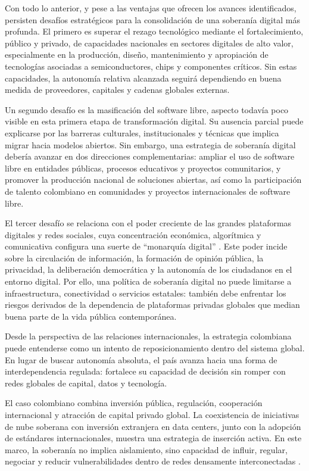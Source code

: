 \documentclass[9pt,letterpaper,twocolumn,twoside,apabib]{rho-class/rho}
\begin{document}
Con todo lo anterior, y pese a las ventajas que ofrecen los avances identificados, persisten desafíos estratégicos para la consolidación de una soberanía digital más profunda. El primero es superar el rezago tecnológico mediante el fortalecimiento, público y privado, de capacidades nacionales en sectores digitales de alto valor, especialmente en la producción, diseño, mantenimiento y apropiación de tecnologías asociadas a semiconductores, chips y componentes críticos. Sin estas capacidades, la autonomía relativa alcanzada seguirá dependiendo en buena medida de proveedores, capitales y cadenas globales externas.

Un segundo desafío es la masificación del software libre, aspecto todavía poco visible en esta primera etapa de transformación digital. Su ausencia parcial puede explicarse por las barreras culturales, institucionales y técnicas que implica migrar hacia modelos abiertos. Sin embargo, una estrategia de soberanía digital debería avanzar en dos direcciones complementarias: ampliar el uso de software libre en entidades públicas, procesos educativos y proyectos comunitarios, y promover la producción nacional de soluciones abiertas, así como la participación de talento colombiano en comunidades y proyectos internacionales de software libre.

El tercer desafío se relaciona con el poder creciente de las grandes plataformas digitales y redes sociales, cuya concentración económica, algorítmica y comunicativa configura una suerte de “monarquía digital” \parencite{peirano_enemigo_nodate}. Este poder incide sobre la circulación de información, la formación de opinión pública, la privacidad, la deliberación democrática y la autonomía de los ciudadanos en el entorno digital. Por ello, una política de soberanía digital no puede limitarse a infraestructura, conectividad o servicios estatales: también debe enfrentar los riesgos derivados de la dependencia de plataformas privadas globales que median buena parte de la vida pública contemporánea.


Desde la perspectiva de las relaciones internacionales, la estrategia colombiana puede entenderse como un intento de reposicionamiento dentro del sistema global. En lugar de buscar autonomía absoluta, el país avanza hacia una forma de interdependencia regulada: fortalece su capacidad de decisión sin romper con redes globales de capital, datos y tecnología.

El caso colombiano combina inversión pública, regulación, cooperación internacional y atracción de capital privado global. La coexistencia de iniciativas de nube soberana con inversión extranjera en data centers, junto con la adopción de estándares internacionales, muestra una estrategia de inserción activa. En este marco, la soberanía no implica aislamiento, sino capacidad de influir, regular, negociar y reducir vulnerabilidades dentro de redes densamente interconectadas \parencite{keohane_nye_power_2011}.
\end{document}
